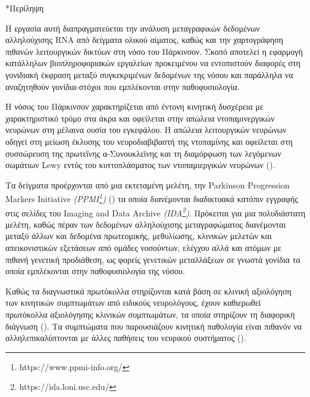 \documentclass[12pt]{report}
\makeatletter
\let\oldchapter\chapter
\renewcommand{\chapter}{\@ifstar{\starchapter}{\nostarchapter}}
\newcommand{\starchapter}[1]{\oldchapter*{#1}\thispagestyle{mainstyle}}
\newcommand{\nostarchapter}[1]{\oldchapter{#1}\thispagestyle{mainstyle}}
\let\oldfootnote\footnote
\renewcommand{\footnote}[1]{\oldfootnote{\onehalfspacing #1}}
\makeatother
\begin{document}
\cleardoublepage
\pagestyle{mainstyle}

\chapter*{Περίληψη}
    \par
        H εργασία αυτή διαπραγματεύεται την ανάλυση μεταγραφικών δεδομένων αλληλούχισης RNA από δείγματα ολικού αίματος, καθώς και την χαρτογράφηση πιθανών λειτουργικών δικτύων στη νόσο του Πάρκινσον. Σκοπό αποτελεί η εφαρμογή κατάλληλων βιοπληροφοριακών εργαλείων προκειμένου να εντοπιστούν διαφορές στη γονιδιακή έκφραση μεταξύ συγκεκριμένων δεδομένων της νόσου και παράλληλα να αναζητηθούν γονίδια-στόχοι που εμπλέκονται στην παθοφυσιολογία.
    \par
        Η νόσος του Πάρκινσον χαρακτηρίζεται από έντονη κινητική δυσχέρεια με χαρακτηριστικό τρόμο στα άκρα και οφείλεται στην απώλεια ντοπαμινεργικών νευρώνων στη μέλαινα ουσία του εγκεφάλου. Η απώλεια λειτουργικών νευρώνων οδηγεί στη μείωση έκλυσης του νευροδιαβιβαστή της ντοπαμίνης και οφείλεται στη συσσώρευση της πρωτεΐνης α-Συνουκλεϊνης και τη διαμόρφωση των λεγόμενων σωμάτιων Lewy εντός του κυττοπλάσματος των ντοπαμιεργικών νευρώνων (\emph{\cite{Balestrino2020ParkinsonDisease}}).
    \par
        Τα δείγματα προέρχονται από μια εκτεταμένη μελέτη, την Parkinson Progression Markers Initiative \emph{(PPMI\footnote{https://www.ppmi-info.org/})} (\emph{\cite{Marek2011ThePPMI}}) τα οποία διανέμονται διαδικτυακά κατόπιν εγγραφής στις σελίδες του Imaging and Data Archive \emph{(IDA\footnote{https://ida.loni.usc.edu/})}. Πρόκειται για μια πολυδιάστατη μελέτη, καθώς πέραν των δεδομένων αλληλούχισης μεταγραφώματος διανέμονται μεταξύ άλλων και δεδομένα πρωτεομικής, μεθυλίωσης, κλινικών μελετών και απεικονιστικών εξετάσεων από ομάδες νοσούντων, ελέγχου αλλά και ατόμων με πιθανή γενετική προδιάθεση, ως φορείς γενετικών μεταλλάξεων σε γνωστά γονίδια τα οποία εμπλέκονται στην παθοφυσιολογία της νόσου.
    \par
        Καθώς τα διαγνωστικά πρωτόκολλα στηρίζονται κατά βάση σε κλινική αξιολόγηση των κινητικών συμπτωμάτων από ειδικούς νευρολόγους, έχουν καθιερωθεί πρωτόκολλα αξιολόγησης κλινικών συμπτωμάτων, τα οποία στηρίζουν τη διαφορική διάγνωση (\emph{\cite{Koller2018TableGuidelines}}). Τα συμπτώματα που παρουσιάζουν κινητική παθολογία είναι πιθανόν να αλληλεπικαλύπτονται με άλλες παθήσεις του νευρικού συστήματος (\emph{\cite{Tolosa2021ChallengesDisease}}). 
\end{document}
